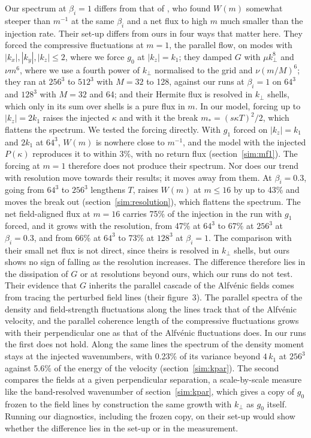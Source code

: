 Our spectrum at $\beta_i=1$ differs from that of \citet{Meyrand2019}, who found $W(m)$ somewhat steeper than $m^{-1}$ at the same $\beta_i$ and a net flux to high $m$ much smaller than the injection rate. Their set-up differs from ours in four ways that matter here. They forced the compressive fluctuations at $m=1$, the parallel flow, on modes with $|k_x|,|k_y|,|k_z|\le2$, where we force $g_0$ at $|k_z|=k_1$; they damped $G$ with $\mu k_\perp^8$ and $\nu m^6$, where we use a fourth power of $k_\perp$ normalised to the grid and $\nu(m/M)^6$; they ran at $256^3$ to $512^3$ with $M=32$ to 128, against our runs at $\beta_i=1$ on $64^3$ and $128^3$ with $M=32$ and 64; and their Hermite flux is resolved in $k_\perp$ shells, which only in its sum over shells is a pure flux in $m$. In our model, forcing up to $|k_z|=2k_1$ raises the injected $\kappa$ and with it the break $m_*=(s\kappa T)^2/2$, which flattens the spectrum. We tested the forcing directly. With $g_1$ forced on $|k_z|=k_1$ and $2k_1$ at $64^3$, $W(m)$ is nowhere close to $m^{-1}$, and the model with the injected $P(\kappa)$ reproduces it to within 3\%, with no return flux (section~\ref{sim:mf1}). The forcing at $m=1$ therefore does not produce their spectrum. Nor does our trend with resolution move towards their results; it moves away from them. At $\beta_i=0.3$, going from $64^3$ to $256^3$ lengthens $T$, raises $W(m)$ at $m\le16$ by up to 43\% and moves the break out (section~\ref{sim:resolution}), which flattens the spectrum. The net field-aligned flux at $m=16$ carries 75\% of the injection in the run with $g_1$ forced, and it grows with the resolution, from 47\% at $64^3$ to 67\% at $256^3$ at $\beta_i=0.3$, and from 66\% at $64^3$ to 73\% at $128^3$ at $\beta_i=1$. The comparison with their small net flux is not direct, since theirs is resolved in $k_\perp$ shells, but ours shows no sign of falling as the resolution increases. The difference therefore lies in the dissipation of $G$ or at resolutions beyond ours, which our runs do not test. Their evidence that $G$ inherits the parallel cascade of the Alfv\'enic fields comes from tracing the perturbed field lines (their figure~3). The parallel spectra of the density and field-strength fluctuations along the lines track that of the Alfv\'enic velocity, and the parallel coherence length of the compressive fluctuations grows with their perpendicular one as that of the Alfv\'enic fluctuations does. In our runs the first does not hold. Along the same lines the spectrum of the density moment stays at the injected wavenumbers, with 0.23\% of its variance beyond $4\,k_1$ at $256^3$ against 5.6\% of the energy of the velocity (section~\ref{sim:kpar}).
 The second compares the fields at a given perpendicular separation, a scale-by-scale measure like the band-resolved wavenumber of section~\ref{sim:kpar}, which gives a copy of $g_0$ frozen to the field lines by construction the same growth with $k_\perp$ as $g_0$ itself. Running our diagnostics, including the frozen copy, on their set-up would show whether the difference lies in the set-up or in the measurement.

